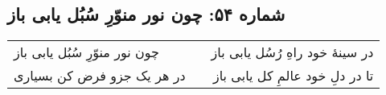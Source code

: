 \begin{center}
\section*{شماره ۵۴: چون نور منوّرِ سُبُل یابی باز}
\label{sec:054}
\begin{longtable}{l p{0.5cm} r}
چون نور منوّرِ سُبُل یابی باز
&&
در سینهٔ خود راهِ رُسُل یابی باز
\\
در هر یک جزو فرض کن بسیاری
&&
تا در دلِ خود عالمِ کل یابی باز
\\
\end{longtable}
\end{center}
